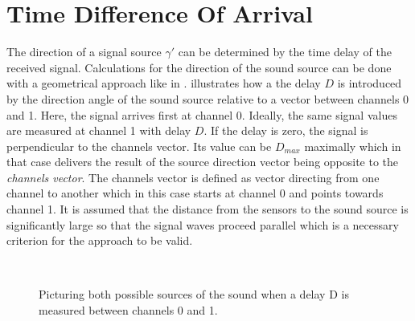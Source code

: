\section{Time Difference Of Arrival}
\label{sec:02_tdoa}

The direction of a signal source $\gamma'$ can be determined by the time
delay of the received signal.
Calculations for the direction of the sound source can be done with a
geometrical approach like in \cite{Valin_Michaud}.
 illustrates how a the delay $D$ is introduced by the direction angle
of the sound source relative to a vector between channels 0 and 1.
Here, the signal arrives first at channel 0. Ideally, the same signal values
are measured at channel 1 with delay $D$.
If the delay is zero, the signal is perpendicular to the channels vector.
Its value can be $D_{max}$ maximally which in that case delivers the
result of the source direction vector being opposite to the \textit{channels vector}.
The channels vector is defined as vector directing from one channel to another which
in this case starts at channel 0 and points towards channel 1.
It is assumed that the distance from the sensors to the sound source is
significantly large so that the signal waves proceed parallel which is a necessary
criterion for the approach to be valid.
\begin{figure}[ht]
    \centering
    \\
    \caption[Illustration of TDOA]{Picturing both possible sources of the sound when a delay D is
               measured between channels 0 and 1.}
    \label{fig:02_tdoa}
\end{figure}

